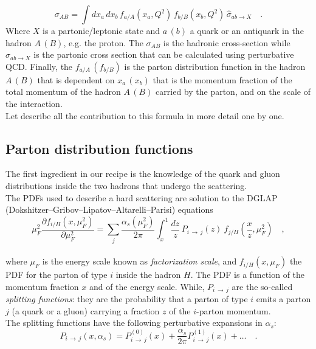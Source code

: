 \begin{equation}
	\sigma_{AB}=\displaystyle\int dx_a\,dx_b\,f_{a/A}(x_a,Q^2)\,f_{b/B}(x_b,Q^2)\,\hat{\sigma}_{ab \rightarrow X}\quad .
\label{eq:factorization2}
\end{equation}
Where $X$ is a partonic/leptonic state and $a\,(b)$ a quark or an antiquark in the hadron $A\,(B)$, e.g. the proton. The $\sigma_{AB}$ is the hadronic cross-section while $\sigma_{ab\rightarrow X}$ is the partonic cross section that can be calculated using perturbative QCD. Finally, the $f_{a/A}\,(f_{b/B})$ is the parton distribution function in the hadron $A\,(B)$ that is dependent on $x_a\,(x_b)$ that is the momentum fraction of the total momentum of the hadron $A\,(B)$ carried by the parton, and on the scale of the interaction. 
\\
Let describe all the contribution to this formula in more detail one by one.

\subsection{Parton distribution functions}

The first ingredient in our recipe is the knowledge of the quark and gluon distributions inside the two hadrons that undergo the scattering. 
\\
The PDFs used to describe a hard scattering are solution to the DGLAP (Dokshitzer–Gribov–Lipatov–Altarelli–Parisi) equations \cite{Lipatov:400357, Gribov:427157, ALTARELLI1977298, Dokshitzer:1977sg}
\\
\begin{equation}
	\mu_F^2\frac{\partial f_{i/H}(x,\mu_F^2)}{\partial\mu_F^2}=\displaystyle\sum_j\frac{\alpha_s(\mu_F^2)}{2\pi}\displaystyle\int_x^1 \frac{dz}{z}\, P_{i\,\rightarrow\,j}(z)\ f_{j/H}\left(\frac{x}{z},\mu_F^2\right)\quad ,
\end{equation}
\\
where $\mu_F$ is the energy scale known as  \textit{factorization scale}, and $f_{i/H}(x,\mu_F)$ the PDF for the parton of type $i$ inside the hadron $H$. The PDF is a function of the momentum fraction $x$ and of the energy scale.
While, $P_{i\,\rightarrow\,j}$ are the so-called \textit{splitting functions}: they are the probability that a parton of type $i$ emits a parton $j$ (a quark or a gluon) carrying a fraction $z$ of the $i$-parton momentum.
\\
The splitting functions have the following perturbative expansions in $\alpha_s$: 
\begin{equation}
	P_{i\,\rightarrow\,j}(x,\alpha_s)=P_{i\,\rightarrow\,j}^{(0)}(x)+\frac{\alpha_s}{2\pi}P_{i\,\rightarrow\,j}^{(1)}(x)+\dots\quad .
\end{equation}


